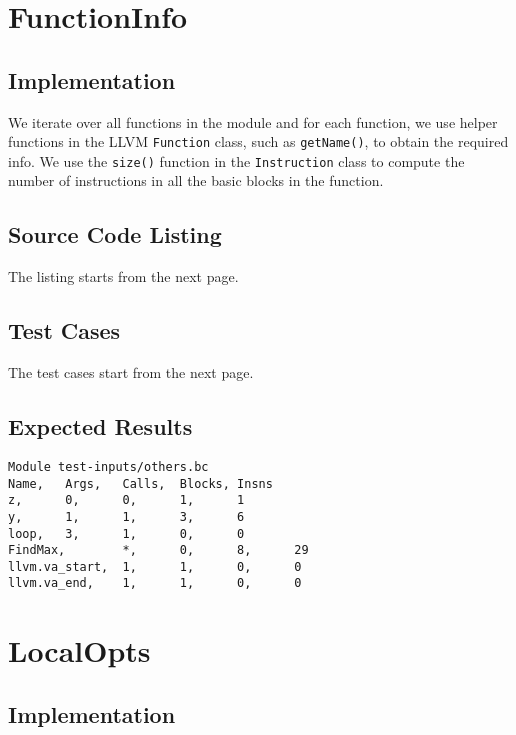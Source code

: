 \section{FunctionInfo}

\subsection{Implementation}

We iterate over all functions in the module and for each function, we use helper functions in the
LLVM \texttt{Function} class, such as \texttt{getName()}, to obtain the required info.
We use the \texttt{size()} function in the \texttt{Instruction} class to compute the number of
instructions in all the basic blocks in the function.

\subsection{Source Code Listing}

The listing starts from the next page.



\subsection{Test Cases}

The test cases start from the next page.



\subsection{Expected Results}

\begin{verbatim}
Module test-inputs/others.bc
Name,   Args,   Calls,  Blocks, Insns
z,      0,      0,      1,      1
y,      1,      1,      3,      6
loop,   3,      1,      0,      0
FindMax,        *,      0,      8,      29
llvm.va_start,  1,      1,      0,      0
llvm.va_end,    1,      1,      0,      0
\end{verbatim}

\section{LocalOpts}

\subsection{Implementation}

